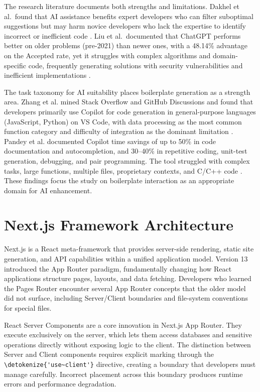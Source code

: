 \documentclass[12pt,a4paper]{report}
\newcommand{\code}[1]{\texttt{\nolinkurl{\detokenize{#1}}}}
\newcommand{\usec}{\code{'use~client'}}
\begin{document}
The research literature documents both strengths and limitations. Dakhel et al.\ found that AI assistance benefits expert developers who can filter suboptimal suggestions but may harm novice developers who lack the expertise to identify incorrect or inefficient code \parencite{dakhel2023github}. Liu et al.\ documented that ChatGPT performs better on older problems (pre-2021) than newer ones, with a 48.14\% advantage on the Accepted rate, yet it struggles with complex algorithms and domain-specific code, frequently generating solutions with security vulnerabilities and inefficient implementations \parencite{liu2024chatgpt}.

The task taxonomy for AI suitability places boilerplate generation as a strength area. Zhang et al. mined Stack Overflow and GitHub Discussions and found that developers primarily use Copilot for code generation in general-purpose languages (JavaScript, Python) on VS Code, with data processing as the most common function category and difficulty of integration as the dominant limitation \parencite{zhang2023practices}. Pandey et al. documented Copilot time savings of up to 50\% in code documentation and autocompletion, and 30--40\% in repetitive coding, unit-test generation, debugging, and pair programming. The tool struggled with complex tasks, large functions, multiple files, proprietary contexts, and C/C++ code \parencite{pandey2024transforming}. These findings focus the study on boilerplate interaction as an appropriate domain for AI enhancement.

\section{Next.js Framework Architecture}

Next.js is a React meta-framework that provides server-side rendering, static site generation, and API capabilities within a unified application model. Version 13 introduced the App Router paradigm, fundamentally changing how React applications structure pages, layouts, and data fetching. Developers who learned the Pages Router encounter several App Router concepts that the older model did not surface, including Server/Client boundaries and file-system conventions for special files.

React Server Components are a core innovation in Next.js App Router. They execute exclusively on the server, which lets them access databases and sensitive operations directly without exposing logic to the client. The distinction between Server and Client components requires explicit marking through the \usec{} directive, creating a boundary that developers must manage carefully. Incorrect placement across this boundary produces runtime errors and performance degradation.
\end{document}

